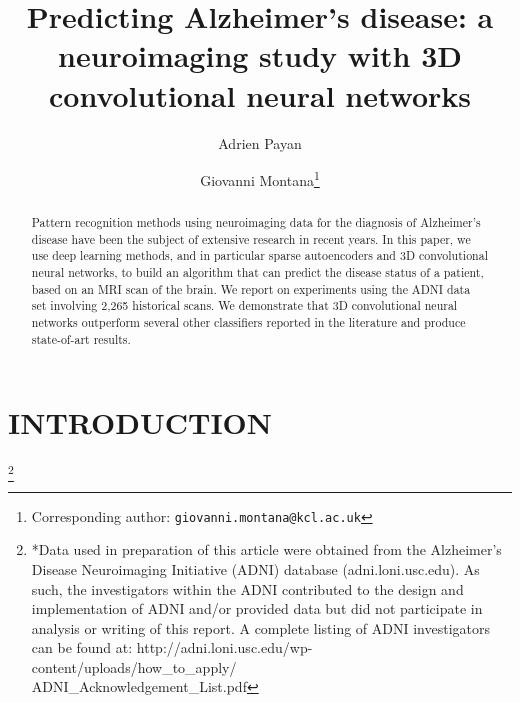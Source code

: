\documentclass[a4paper,10pt]{article}
\begin{document}
\title{Predicting Alzheimer's disease: a neuroimaging study with 3D convolutional neural networks}  

\author[1]{Adrien Payan} 
\author[1,2]{Giovanni Montana\footnote{Corresponding author: \tt{giovanni.montana@kcl.ac.uk}}}


\maketitle

\begin{abstract}

Pattern recognition methods using neuroimaging data for the diagnosis of Alzheimer's disease have been the subject of extensive research in recent years. In this paper, we use deep learning methods, and in particular sparse autoencoders and 3D convolutional neural networks, to build an algorithm that can predict the disease status of a patient, based on an MRI scan of the brain. We report on experiments using the ADNI data set involving 2,265 historical scans. We demonstrate that 3D convolutional neural networks outperform several other classifiers reported in the literature and produce state-of-art results.

\end{abstract}

\section{\uppercase{Introduction}}\label{sec:introduction}

\let\thefootnote\relax\footnote{*Data used in preparation of this article were obtained from the Alzheimer's Disease Neuroimaging Initiative (ADNI) database (adni.loni.usc.edu). As such, the investigators within the ADNI contributed to the design and implementation of ADNI and/or provided data but did not participate in analysis or writing of this report. A complete listing of ADNI investigators can be found at: http://adni.loni.usc.edu/wp-content/uploads/how\_to\_apply/\\ADNI\_Acknowledgement\_List.pdf}
\end{document}

